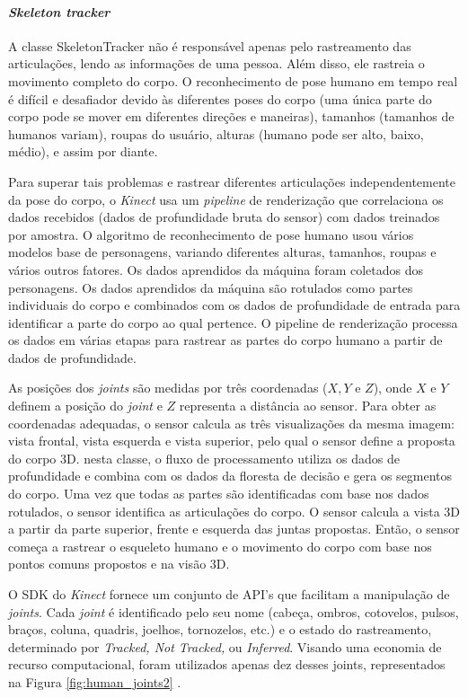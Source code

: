 \paragraph{\textit{Skeleton tracker}}\label{sec:SkeletonTracker}
A classe SkeletonTracker não é responsável apenas pelo rastreamento das articulações, lendo as informações de uma pessoa. Além disso, ele rastreia o movimento completo do corpo. O reconhecimento de pose humano em tempo real é difícil e desafiador devido às diferentes poses do corpo (uma única parte do corpo pode se mover em diferentes direções e maneiras), tamanhos (tamanhos de humanos variam), roupas do usuário, alturas (humano pode ser alto, baixo, médio), e assim por diante.

Para superar tais problemas e rastrear diferentes articulações independentemente da pose do corpo, o \textit{Kinect} usa um \textit{pipeline} de renderização que correlaciona os dados recebidos (dados de profundidade bruta do sensor) com dados treinados por amostra. O algoritmo de reconhecimento de pose humano usou vários modelos base de personagens, variando diferentes alturas, tamanhos, roupas e vários outros fatores. Os dados aprendidos da máquina foram coletados dos personagens. Os dados aprendidos da máquina são rotulados como partes individuais do corpo e combinados com os dados de profundidade de entrada para identificar a parte do corpo ao qual pertence. O pipeline de renderização processa os dados em várias etapas para rastrear as partes do corpo humano a partir de dados de profundidade.

As posições dos \textit{joints} são medidas por três coordenadas ($X, Y$ e $Z$), onde $X$ e $Y$ definem a posição do \textit{joint} e $Z$ representa a distância ao sensor. Para obter as coordenadas adequadas, o sensor calcula as três visualizações da mesma imagem: vista frontal, vista esquerda e vista superior, pelo qual o sensor define a proposta do corpo 3D. nesta classe, o fluxo de processamento  utiliza os dados de profundidade e combina com os dados da floresta de decisão e gera os segmentos do corpo. Uma vez que todas as partes são identificadas com base nos dados rotulados, o sensor identifica as articulações do corpo. O sensor calcula a vista 3D a partir da parte superior, frente e esquerda das juntas propostas. Então, o sensor começa a rastrear o esqueleto humano e o movimento do corpo com base nos pontos comuns propostos e na visão 3D.

O SDK do \textit{Kinect} fornece um conjunto de API's que facilitam a manipulação de \textit{joints}. Cada \textit{joint} é identificado pelo seu nome (cabeça, ombros, cotovelos, pulsos, braços, coluna, quadris, joelhos, tornozelos, etc.) e o estado do rastreamento, determinado por \textit{Tracked, Not Tracked,} ou \textit{Inferred}. Visando uma economia de recurso computacional, foram utilizados apenas dez desses joints, representados na Figura  \ref{fig:human_joints2} .

